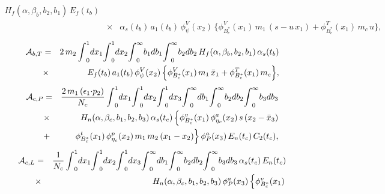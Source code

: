\documentclass[preprint,superscriptaddress,nofootinbib]{revtex4}
\begin{document}
\begin{appendix}
\begin{eqnarray}
  H_{f}({\alpha},{\beta}_{b},b_{2},b_{1})\,
  E_{f}(t_{b})
   \nonumber \\ &{\times}&
  {\alpha}_{s}(t_{b})\, a_{1}(t_{b})\, {\phi}_{\psi}^{V}(x_{2})\, \Big\{
    {\phi}_{B_{c}^{\ast}}^{V}(x_{1})\, m_{1}\, (s-u\,x_{1})
  + {\phi}_{B_{c}^{\ast}}^{T}(x_{1})\,m_{c}\,u \Big\}
   \label{amp:b-03},
   \end{eqnarray}
   \begin{eqnarray}
  {\cal A}_{b,T} &=&
  2\, m_{2}\,
  {\int}_{0}^{1}dx_{1}
  {\int}_{0}^{1}dx_{2}
  {\int}_{0}^{\infty}b_{1}db_{1}
  {\int}_{0}^{\infty}b_{2}db_{2}\,
  H_{f}({\alpha},{\beta}_{b},b_{2},b_{1})\,
  {\alpha}_{s}(t_{b})
   \nonumber \\ &{\times}&
   E_{f}(t_{b})\, a_{1}(t_{b})\,
    {\phi}_{\psi}^{V}(x_{2})\, \Big\{
    {\phi}_{B_{c}^{\ast}}^{V}(x_{1})\, m_{1}\, \bar{x}_{1}
  + {\phi}_{B_{c}^{\ast}}^{T}(x_{1})\, m_{c} \Big\}
   \label{amp:b-04},
   \end{eqnarray}
   \begin{eqnarray}
  {\cal A}_{c,P} &=&
   \frac{ 2\,m_{1}\,({\epsilon}_{1}{\cdot}p_{2}) }{ N_{c} }\,
  {\int}_{0}^{1}dx_{1}
  {\int}_{0}^{1}dx_{2}
  {\int}_{0}^{1}dx_{3}
  {\int}_{0}^{\infty}db_{1}
  {\int}_{0}^{\infty}b_{2}db_{2}
  {\int}_{0}^{\infty}b_{3}db_{3}
   \nonumber \\ &{\times}&
   H_{n}({\alpha},{\beta}_{c},b_{1},b_{2},b_{3})\,
   {\alpha}_{s}(t_{c})\,
  \Big\{ {\phi}_{B_{c}^{\ast}}^{v}(x_{1})\,
  {\phi}_{{\eta}_{c}}^{a}(x_{2})\, s\,(x_{2}-\bar{x}_{3})
   \nonumber \\ &+&
  {\phi}_{B_{c}^{\ast}}^{t}(x_{1})\,
  {\phi}_{{\eta}_{c}}^{p}(x_{2})\, m_{1}\, m_{2}\,(x_{1}-x_{2}) \Big\}\,
  {\phi}_{P}^{a}(x_{3})\, E_{n}(t_{c})\, C_{2}(t_{c})
   \label{amp:c-01},
   \end{eqnarray}
   \begin{eqnarray}
  {\cal A}_{c,L} &=&
   \frac{1}{N_{c}}\,
  {\int}_{0}^{1}dx_{1}
  {\int}_{0}^{1}dx_{2}
  {\int}_{0}^{1}dx_{3}
  {\int}_{0}^{\infty}db_{1}
  {\int}_{0}^{\infty}b_{2}db_{2}
  {\int}_{0}^{\infty}b_{3}db_{3}\,
  {\alpha}_{s}(t_{c})\,  E_{n}(t_{c})
   \nonumber \\ &{\times}&
  H_{n}({\alpha},{\beta}_{c},b_{1},b_{2},b_{3})\,
  {\phi}_{P}^{a}(x_{3})\,
   \Big\{ {\phi}_{B_{c}^{\ast}}^{v}(x_{1})\,

\end{eqnarray}
\end{appendix}
\end{document}
